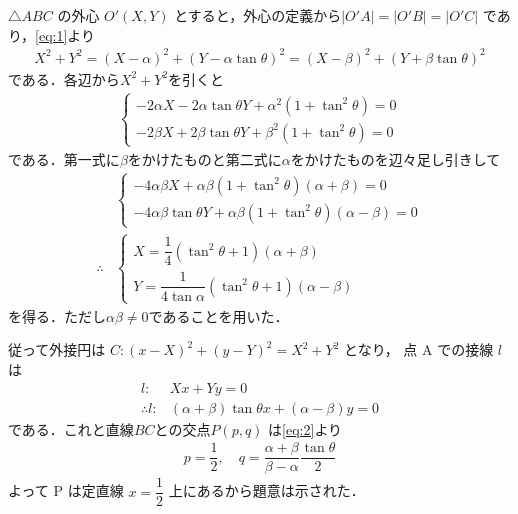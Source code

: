 \documentclass[../../main.tex]{subfiles}
\begin{document}
$\triangle ABC$ の外心 $O'(X,Y)$ とすると，外心の定義から$|O'A| = |O'B| = |O'C|$ であり，\cref{eq:1}より
\begin{align}
  X^2 + Y^2 = (X-\alpha)^2 + (Y-\alpha \tan \theta)^2 = (X-\beta)^2 + (Y+\beta \tan \theta)^2
\end{align}
である．各辺から$X^2+Y^2$を引くと
\begin{align}
  \begin{cases}
    -2\alpha X - 2\alpha\tan\theta Y +\alpha^2(1+\tan^2\theta) = 0 \\
    -2\beta  X + 2\beta\tan\theta  Y +\beta^2(1+\tan^2\theta) = 0
  \end{cases} \label{eq:4}
\end{align}
である．第一式に$\beta$をかけたものと第二式に$\alpha$をかけたものを辺々足し引きして
\begin{align}
  &
  \begin{cases}
    -4\alpha\beta X + \alpha\beta(1+\tan^2\theta)(\alpha+\beta) = 0 \\
    -4 \alpha\beta\tan\theta Y + \alpha\beta(1+\tan^2\theta)(\alpha-\beta) = 0
  \end{cases} \\
  \therefore
  &
  \begin{cases}
    X = \dfrac{1}{4} (\tan^2\theta + 1)(\alpha + \beta) \\
    Y = \dfrac{1}{4\tan\alpha} (\tan^2\theta + 1)(\alpha - \beta)
  \end{cases} \label{eq:5}
\end{align}
を得る．ただし$\alpha\beta \neq 0$であることを用いた．

従って外接円は $C: (x-X)^2 + (y-Y)^2 = X^2 + Y^2$ となり，
点 A での接線 $l$ は
\begin{align}
  l: &Xx + Yy = 0 \\
  \therefore
  l: &(\alpha + \beta)\tan\theta x + (\alpha - \beta)y = 0 \label{eq:6}
\end{align}
である．これと直線$BC$との交点$P(p,q)$ は\cref{eq:2}より
\begin{align}
  p = \dfrac{1}{2}, \quad q = \dfrac{\alpha + \beta}{\beta - \alpha} \dfrac{\tan\theta}{2}
\end{align}
よって P は定直線 $x = \dfrac{1}{2}$ 上にあるから題意は示された．
\end{document}
